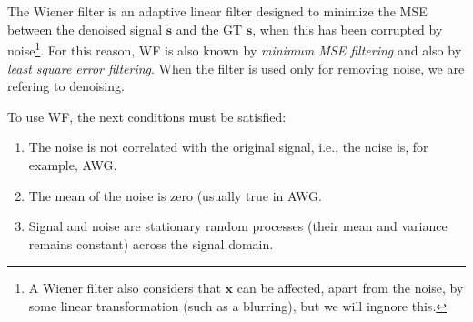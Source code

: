 \chapter{}
\label{cha:WF}

The Wiener filter \cite{wiener1942extrapolation} is an adaptive linear
filter designed to minimize the MSE between the denoised signal
$\tilde{\mathbf{s}}$ and the \gls{GT} $\mathbf{s}$, when this has been
corrupted by noise\footnote{A Wiener filter also considers that
  $\mathbf{x}$ can be affected, apart from the noise, by some linear
  transformation (such as a blurring), but we will ingnore this.}. For
this reason, \gls{WF} is also known by \emph{minimum \gls{MSE} filtering} and also
by \emph{least square error filtering}. When the filter is used only
for removing noise, we are refering to denoising.

To use \gls{WF}, the next conditions must be satisfied:
\begin{enumerate}
\item The noise is not correlated with the original signal, i.e., the
  noise is, for example, \gls{AWG}.
\item The mean of the noise is zero (usually true in \gls{AWG}.
\item Signal and noise are stationary random processes (their mean and
  variance remains constant) across the signal domain.
\end{enumerate}

